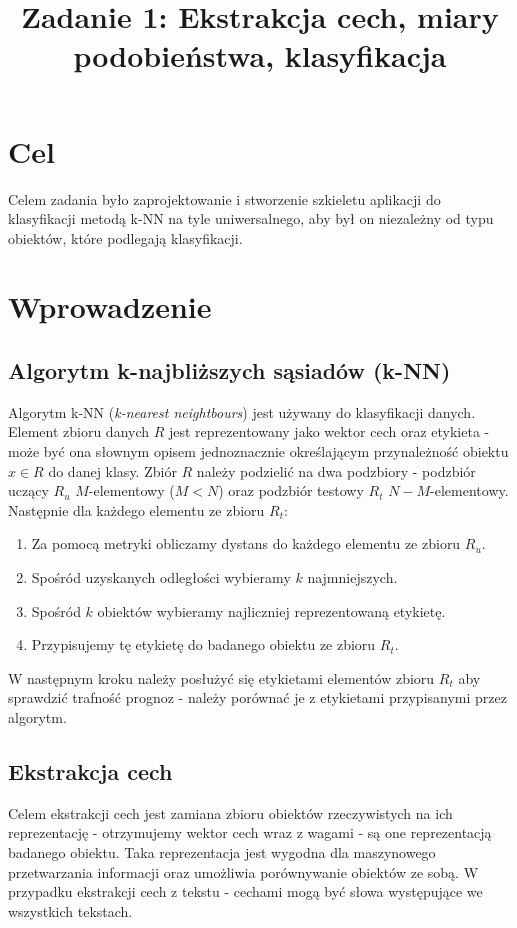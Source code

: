 \documentclass{classrep}
\author{
  \studentinfo{Marcin Pajkowski}{211968} \and
  \studentinfo{Rafał Warda}{214067}
}
\title{Zadanie 1: Ekstrakcja cech, miary podobieństwa, klasyfikacja}
\begin{document}
\maketitle

\section{Cel}
Celem zadania było zaprojektowanie i stworzenie szkieletu aplikacji do klasyfikacji metodą k-NN na
tyle uniwersalnego, aby był on niezależny od typu obiektów, które podlegają klasyfikacji.

\section{Wprowadzenie}
\subsection{Algorytm k-najbliższych sąsiadów (k-NN)}
Algorytm k-NN (\textit{k-nearest neightbours}) jest używany do klasyfikacji danych.
Element zbioru danych $ R $ jest reprezentowany jako wektor cech oraz etykieta - może być
ona słownym opisem jednoznacznie określającym przynależność obiektu $ x \in R $ do danej
klasy. Zbiór $R$ należy podzielić na dwa podzbiory - podzbiór uczący $ R_u $ $ M
$-elementowy ($M < N$) oraz podzbiór testowy $ R_t $ $ N-M $-elementowy.  \newline\newline
Następnie dla każdego elementu ze zbioru $ R_t $:

\begin{enumerate}
  \item Za pomocą metryki obliczamy dystans do każdego elementu ze zbioru $ R_u $.
  \item Spośród uzyskanych odległości wybieramy $k$ najmniejszych.
  \item Spośród $ k $ obiektów wybieramy najliczniej reprezentowaną etykietę.
  \item Przypisujemy tę etykietę do badanego obiektu ze zbioru $ R_t $.
\end{enumerate}

W następnym kroku należy posłużyć się etykietami elementów zbioru $ R_t $ aby sprawdzić trafność
prognoz - należy porównać je z etykietami przypisanymi przez algorytm.

\subsection{Ekstrakcja cech}
Celem ekstrakcji cech jest zamiana zbioru obiektów rzeczywistych na ich reprezentację -
otrzymujemy wektor cech wraz z wagami - są one reprezentacją badanego obiektu.
Taka reprezentacja jest wygodna dla maszynowego przetwarzania informacji oraz
umożliwia porównywanie obiektów ze sobą. W przypadku ekstrakcji cech z tekstu - cechami
mogą być słowa występujące we wszystkich tekstach.
\end{document}
